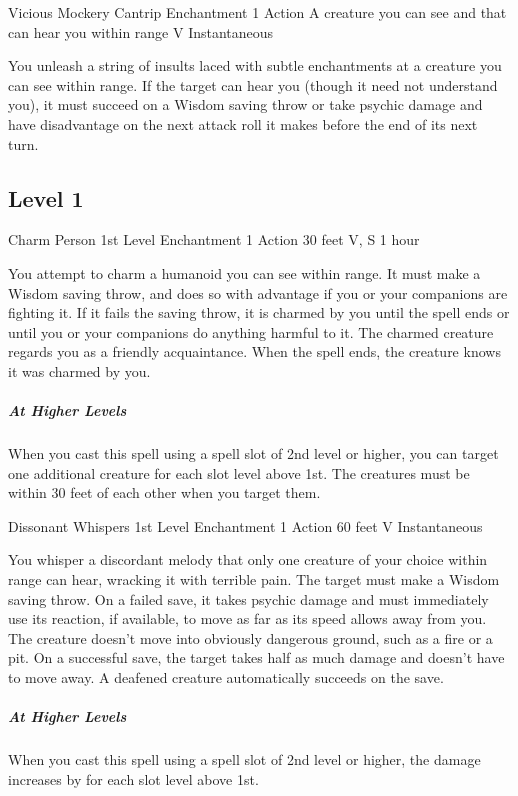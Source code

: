 \documentclass[letterpaper,openany,oneside,twocolumn]{book}
\begin{document}
\DndSpellHeader
  {Vicious Mockery}
  {Cantrip Enchantment}
  {1 Action}
  {A creature you can see and that can hear you within range}
  {V}
  {Instantaneous}

You unleash a string of insults laced with subtle enchantments at a creature you can see within range. If the target can hear you (though it need not understand you), it must succeed on a Wisdom saving throw or take  psychic damage and have disadvantage on the next attack roll it makes before the end of its next turn.

\subsection*{Level 1}

\DndSpellHeader
  {Charm Person}
  {1st Level Enchantment}
  {1 Action}
  {30 feet}
  {V, S}
  {1 hour}

You attempt to charm a humanoid you can see within range. It must make a Wisdom saving throw, and does so with advantage if you or your companions are fighting it. If it fails the saving throw, it is charmed by you until the spell ends or until you or your companions do anything harmful to it. The charmed creature regards you as a friendly acquaintance. When the spell ends, the creature knows it was charmed by you.

\subparagraph*{At Higher Levels} When you cast this spell using a spell slot of 2nd level or higher, you can target one additional creature for each slot level above 1st. The creatures must be within 30 feet of each other when you target them.

\DndSpellHeader
  {Dissonant Whispers}
  {1st Level Enchantment}
  {1 Action}
  {60 feet}
  {V}
  {Instantaneous}

You whisper a discordant melody that only one creature of your choice within range can hear, wracking it with terrible pain. The target must make a Wisdom saving throw. On a failed save, it takes  psychic damage and must immediately use its reaction, if available, to move as far as its speed allows away from you. The creature doesn't move into obviously dangerous ground, such as a fire or a pit. On a successful save, the target takes half as much damage and doesn't have to move away. A deafened creature automatically succeeds on the save.

\subparagraph*{At Higher Levels} When you cast this spell using a spell slot of 2nd level or higher, the damage increases by  for each slot level above 1st.
\end{document}
